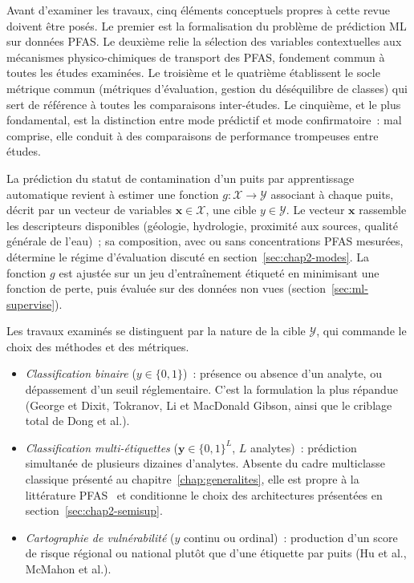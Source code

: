 \label{sec:chap2-cadre}

Avant d'examiner les travaux, cinq \'el\'ements conceptuels propres \`a cette revue doivent \^etre pos\'es.
Le premier est la formalisation du probl\`eme de pr\'ediction ML sur donn\'ees PFAS.
Le deuxi\`eme relie la s\'election des variables contextuelles aux m\'ecanismes physico-chimiques de transport des PFAS, fondement commun \`a toutes les \'etudes examin\'ees.
Le troisi\`eme et le quatri\`eme \'etablissent le socle m\'etrique commun (m\'etriques d'\'evaluation, gestion du d\'es\'equilibre de classes) qui sert de r\'ef\'erence \`a toutes les comparaisons inter-\'etudes.
Le cinqui\`eme, et le plus fondamental, est la distinction entre mode pr\'edictif et mode confirmatoire~: mal comprise, elle conduit \`a des comparaisons de performance trompeuses entre \'etudes.


\label{sec:chap2-formalisation}

La pr\'ediction du statut de contamination d'un puits par apprentissage automatique revient \`a estimer une fonction $g : \mathcal{X} \rightarrow \mathcal{Y}$ associant \`a chaque puits, d\'ecrit par un vecteur de variables $\mathbf{x} \in \mathcal{X}$, une cible $y \in \mathcal{Y}$.
Le vecteur $\mathbf{x}$ rassemble les descripteurs disponibles (g\'eologie, hydrologie, proximit\'e aux sources, qualit\'e g\'en\'erale de l'eau)~; sa composition, avec ou sans concentrations PFAS mesur\'ees, d\'etermine le r\'egime d'\'evaluation discut\'e en section~\ref{sec:chap2-modes}.
La fonction $g$ est ajust\'ee sur un jeu d'entra\^inement \'etiquet\'e en minimisant une fonction de perte, puis \'evalu\'ee sur des donn\'ees non vues (section~\ref{sec:ml-supervise}).

Les travaux examin\'es se distinguent par la nature de la cible $\mathcal{Y}$, qui commande le choix des m\'ethodes et des m\'etriques.
\begin{itemize}
    \item \emph{Classification binaire} ($y \in \{0,1\}$)~: pr\'esence ou absence d'un analyte, ou d\'epassement d'un seuil r\'eglementaire. C'est la formulation la plus r\'epandue (George et Dixit, Tokranov, Li et MacDonald Gibson, ainsi que le criblage total de Dong et al.).
    \item \emph{Classification multi-\'etiquettes} ($\mathbf{y} \in \{0,1\}^L$, $L$ analytes)~: pr\'ediction simultan\'ee de plusieurs dizaines d'analytes. Absente du cadre multiclasse classique pr\'esent\'e au chapitre~\ref{chap:generalites}, elle est propre \`a la litt\'erature PFAS~\cite{dong2024pfas} et conditionne le choix des architectures pr\'esent\'ees en section~\ref{sec:chap2-semisup}.
    \item \emph{Cartographie de vuln\'erabilit\'e} ($y$ continu ou ordinal)~: production d'un score de risque r\'egional ou national plut\^ot que d'une \'etiquette par puits (Hu et al., McMahon et al.).
\end{itemize}

